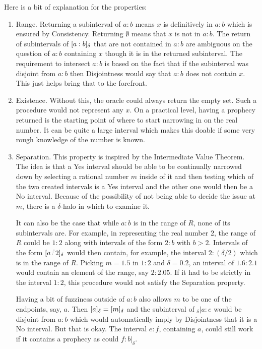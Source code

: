 \documentclass[12pt]{article}
\begin{document}
Here is a bit of explanation for the properties:
\begin{enumerate}
    \item Range. Returning a subinterval of $a:b$ means $x$ is definitively in $a:b$ which is ensured by Consistency. Returning $\emptyset$ means that $x$ is not in $a:b$. The return of subintervals of $[a:b]_{\delta}$ that are not contained in $a:b$ are ambiguous on the question of $a:b$ containing $x$ though it is in the returned subinterval. The requirement to intersect $a:b$ is based on the fact that if the subinterval was disjoint from $a:b$ then Disjointness would say that $a:b$ does not contain $x$. This just helps bring that to the forefront. 
    
    \item Existence. Without this, the oracle could always return the empty set. Such a procedure would not represent any $x$. On a practical level, having a prophecy returned is the starting point of where to start narrowing in on the real number. It can be quite a large interval which makes this doable if some very rough knowledge of the number is known. 
    
    \item Separation. This property is inspired by the Intermediate Value Theorem. The idea is that a Yes interval should be able to be continually narrowed down by selecting a rational number $m$ inside of it and then testing which of the two created intervals is a Yes interval and the other one would then be a No interval. Because of the possibility of not being able to decide the issue at $m$, there is a $\delta$-halo in which to examine it. 
    
    It can also be the case that while $a:b$ is in the range of $R$, none of its subintervals are. For example, in representing the real number $2$, the range of $R$ could be $1:2$ along with intervals of the form $2:b$ with $b >2$. Intervals of the form $\halo{a\lte 2}$ would then contain, for example, the interval $2:(\delta/2)$ which is in the range of $R$. Picking $m=1.5$ in $1:2$ and $\delta = 0.2$, an interval of $1.6:2.1$ would contain an element of the range, say $2:2.05$. If it had to be strictly in the interval $1:2$, this procedure would not satisfy the Separation property. 

    Having a bit of fuzziness outside of $a:b$ also allows $m$ to be one of the endpoints, say, $a$. Then $[a]_{\delta} = [m]_{\delta}$ and the subinterval of ${}_\delta | a : e$ would be disjoint from $a:b$ which would automatically imply by Disjointness that it is a No interval. But that is okay. The interval $e:f$, containing $a$, could still work if it contains a prophecy as could $f:b|_\delta$.
 

\end{enumerate}
\end{document}
